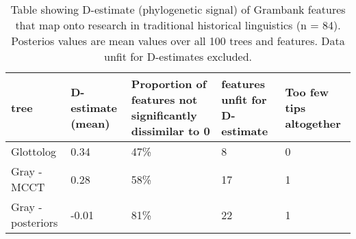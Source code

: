 \begin{table}[ht]
\centering
\begin{tabular}{p{3cm}p{2.2cm}p{4cm}p{3cm}p{2cm}}
  \hline
tree & D-estimate (mean) & Proportion of features not significantly dissimilar to 0 & features unfit for D-estimate & Too few tips altogether \\ 
  \hline
Glottolog & 0.34 & 47\% & 8 & 0 \\ 
  Gray - MCCT & 0.28 & 58\% & 17 & 1 \\ 
  Gray - posteriors & -0.01 & 81\% & 22 & 1 \\ 
   \hline
\end{tabular}
\caption{Table showing D-estimate (phylogenetic signal) of Grambank features that map onto research in traditional historical linguistics (n = 84). Posterios values are mean values over all 100 trees and features. Data unfit for D-estimates excluded.} 
\label{d_estimate_summary}
\end{table}

